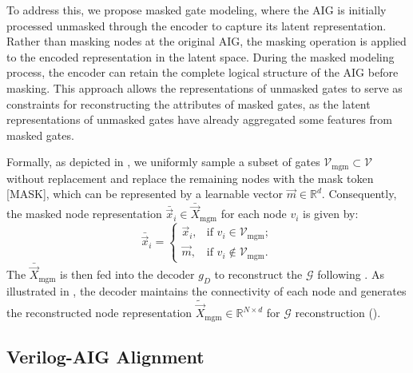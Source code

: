 To address this, we propose masked gate modeling, where the AIG is initially processed unmasked through the encoder to capture its latent representation. 
Rather than masking nodes at the original AIG, the masking operation is applied to the encoded representation in the latent space.
During the masked modeling process, the encoder can retain the complete logical structure of the AIG before masking.
This approach allows the representations of unmasked gates to serve as constraints for reconstructing the attributes of masked gates, as the latent representations of unmasked gates have already aggregated some features from masked gates. 

Formally, as depicted in , we uniformly sample a subset of gates $\mathcal{V}_\text{mgm} \subset \mathcal{V}$ without replacement and replace the remaining nodes with the mask token [MASK], which can be represented by a learnable vector $\Vec{m} \in \mathbb{R}^{d}$.
Consequently, the masked node representation $\bar{\Vec{x}}_i \in \bar{\Vec{X}}_\text{mgm}$ for each node $v_i$ is given by:
\begin{equation}
    \bar{\Vec{x}}_i = \begin{cases} 
        \Vec{x}_{i}, & \text{if } v_{i} \in \mathcal{V}_\text{mgm}; \\
        \Vec{m},     & \text{if } v_{i} \notin \mathcal{V}_\text{mgm}.
    \end{cases}
\end{equation}
The $\bar{\Vec{X}}_\text{mgm}$ is then fed into the decoder $g_{D}$ to reconstruct the $\mathcal{G}$ following . 
As illustrated in , the decoder maintains the connectivity of each node and generates the reconstructed node representation $\tilde{\Vec{X}}_{\text{mgm}} \in \mathbb{R}^{N \times d}$ for $\mathcal{G}$ reconstruction ().

\subsection{Verilog-AIG Alignment}
\label{sec:vga}

